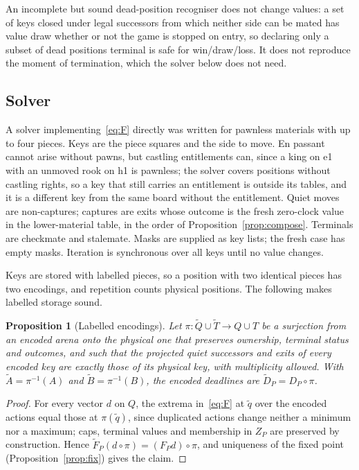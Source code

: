 \documentclass[journal]{IEEEtran}
\newtheorem{proposition}{Proposition}
\theoremstyle{definition}
\theoremstyle{remark}
\begin{document}
An incomplete but sound dead-position recogniser does not change values: a set of keys closed under legal successors from which neither side can be mated has value draw whether or not the game is stopped on entry, so declaring only a subset of dead positions terminal is safe for win/draw/loss. It does not reproduce the moment of termination, which the solver below does not need.

\subsection{Solver}
A solver implementing~\eqref{eq:F} directly was written for pawnless materials with up to four pieces. Keys are the piece squares and the side to move. En passant cannot arise without pawns, but castling entitlements can, since a king on e1 with an unmoved rook on h1 is pawnless; the solver covers positions without castling rights, so a key that still carries an entitlement is outside its tables, and it is a different key from the same board without the entitlement. Quiet moves are non-captures; captures are exits whose outcome is the fresh zero-clock value in the lower-material table, in the order of Proposition~\ref{prop:compose}. Terminals are checkmate and stalemate. Masks are supplied as key lists; the fresh case has empty masks. Iteration is synchronous over all keys until no value changes.

Keys are stored with labelled pieces, so a position with two identical pieces has two encodings, and repetition counts physical positions. The following makes labelled storage sound.

\begin{proposition}[Labelled encodings]\label{prop:lift}
Let $\pi\colon\tilde Q\cup\tilde T\to Q\cup T$ be a surjection from an encoded arena onto the physical one that preserves ownership, terminal status and outcomes, and such that the projected quiet successors and exits of every encoded key are exactly those of its physical key, with multiplicity allowed. With $\tilde A=\pi^{-1}(A)$ and $\tilde B=\pi^{-1}(B)$, the encoded deadlines are $\tilde D_P=D_P\circ\pi$.
\end{proposition}
\begin{proof}
For every vector $d$ on $Q$, the extrema in~\eqref{eq:F} at $\tilde q$ over the encoded actions equal those at $\pi(\tilde q)$, since duplicated actions change neither a minimum nor a maximum; caps, terminal values and membership in $Z_P$ are preserved by construction. Hence $\tilde F_P(d\circ\pi)=(F_Pd)\circ\pi$, and uniqueness of the fixed point (Proposition~\ref{prop:fix}) gives the claim.
\end{proof}
\end{document}
